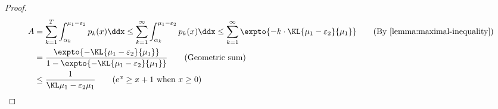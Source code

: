 \begin{proof}
    \begin{align}
        A
        &=
            \sum_{k=1}^{T}
	            \int_{\alpha_k}^{\mu_1 - \varepsilon_2}  
    	        p_k(x) \ddx
	    \leq
            \sum_{k=1}^{\infty}
	            \int_{\alpha_k}^{\mu_1 - \varepsilon_2}  
    	        p_k(x) \ddx
	    \leq
	        \sum_{k=1}^\infty
	            \expto{ -k \cdot \KL{\mu_1 - \varepsilon_2}{\mu_1} }
	                \tag{By \Cref{lemma:maximal-inequality}}
	    \\
	    &=
	        \frac{\expto{ - \KL{\mu_1 - \varepsilon_2}{\mu_1} }}
	             {1 - \expto{ - \KL{\mu_1 - \varepsilon_2}{\mu_1} }}
	                \tag{Geometric sum}
	    \\
	    &\leq
	        \ExpFThreeOneA
	                \tag{$e^x \geq x + 1$ when $x \geq 0$}
	    \\
	                \label{eqn:A}
    \end{align}


\end{proof}

